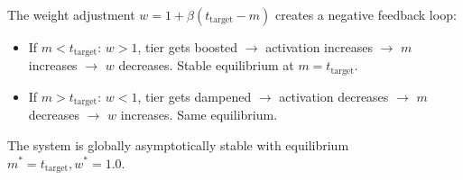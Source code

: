 \documentclass{article}
\begin{document}
The weight adjustment $w = 1 + \beta(t_{\text{target}} - m)$ creates a negative feedback loop:
\begin{itemize}
    \item If $m < t_{\text{target}}$: $w > 1$, tier gets boosted $\rightarrow$ activation increases $\rightarrow$ $m$ increases $\rightarrow$ $w$ decreases. Stable equilibrium at $m = t_{\text{target}}$.
    \item If $m > t_{\text{target}}$: $w < 1$, tier gets dampened $\rightarrow$ activation decreases $\rightarrow$ $m$ decreases $\rightarrow$ $w$ increases. Same equilibrium.
\end{itemize}

The system is globally asymptotically stable with equilibrium $m^* = t_{\text{target}}, w^* = 1.0$.
\end{document}
